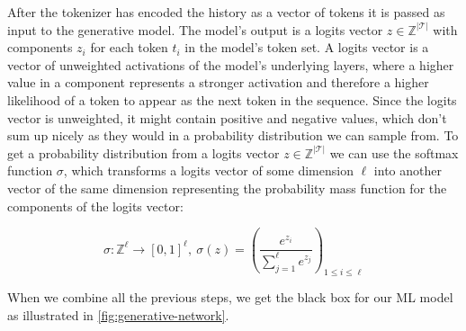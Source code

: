 After the tokenizer has encoded the history as a vector of tokens it is passed as input to the generative model.
The model's output is a logits vector $z \in \mathbb{Z}^{|\mathcal{T}|}$ with components $z_i$ for each token $t_i$ in the model's token set.
A logits vector is a vector of unweighted activations of the model's underlying layers, where a higher value in a component represents a stronger activation and therefore a higher likelihood of a token to appear as the next token in the sequence.
Since the logits vector is unweighted, it might contain positive and negative values, which don't sum up nicely as they would in a probability distribution we can sample from.
To get a probability distribution from a logits vector $z \in \mathbb{Z}^{|\mathcal{T}|}$ we can use the softmax function $\sigma$, which transforms a logits vector of some dimension $\ell$ into another vector of the same dimension representing the probability mass function for the components of the logits vector:

$$\sigma \colon \mathbb{Z}^{\ell} \rightarrow [0,1]^{\ell},~ \sigma(z) = \left(\frac{e^{z_i}}{\sum_{j=1}^{\ell} e^{z_j}}\right)_{1 \leq i \leq \ell}$$

When we combine all the previous steps, we get the black box for our ML model as illustrated in \autoref{fig:generative-network}.

